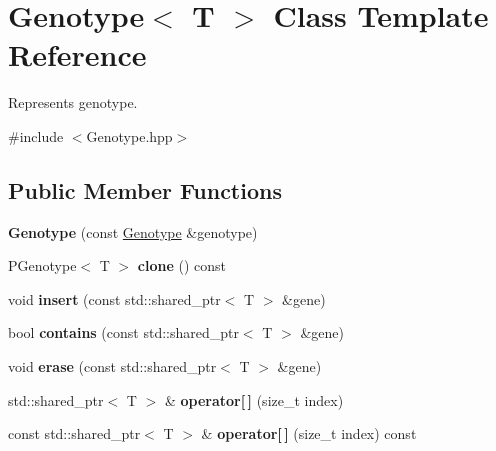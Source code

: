 \hypertarget{classGenotype}{}\section{Genotype$<$ T $>$ Class Template Reference}
\label{classGenotype}


Represents genotype.  




{\ttfamily \#include $<$Genotype.\+hpp$>$}

\subsection*{Public Member Functions}
\begin{DoxyCompactItemize}
\item 
{\bfseries Genotype} (const \hyperlink{classGenotype}{Genotype} \&genotype)\hypertarget{classGenotype_ae29841aca68c4e2f7ab34f5287aab699}{}\label{classGenotype_ae29841aca68c4e2f7ab34f5287aab699}

\item 
P\+Genotype$<$ T $>$ {\bfseries clone} () const \hypertarget{classGenotype_ae530c5a1420c152ea8c944aec6637ae0}{}\label{classGenotype_ae530c5a1420c152ea8c944aec6637ae0}

\item 
void {\bfseries insert} (const std\+::shared\+\_\+ptr$<$ T $>$ \&gene)\hypertarget{classGenotype_aa49caf873e5c01f7b0c36c0905f83902}{}\label{classGenotype_aa49caf873e5c01f7b0c36c0905f83902}

\item 
bool {\bfseries contains} (const std\+::shared\+\_\+ptr$<$ T $>$ \&gene)\hypertarget{classGenotype_aedc67c3bcfc023c2c3d39bfbe6ac4a97}{}\label{classGenotype_aedc67c3bcfc023c2c3d39bfbe6ac4a97}

\item 
void {\bfseries erase} (const std\+::shared\+\_\+ptr$<$ T $>$ \&gene)\hypertarget{classGenotype_a5970e8399e8d0d725517e23e309a32fb}{}\label{classGenotype_a5970e8399e8d0d725517e23e309a32fb}

\item 
std\+::shared\+\_\+ptr$<$ T $>$ \& {\bfseries operator\mbox{[}$\,$\mbox{]}} (size\+\_\+t index)\hypertarget{classGenotype_a79ab71079ff510e6cf879234d1173882}{}\label{classGenotype_a79ab71079ff510e6cf879234d1173882}

\item 
const std\+::shared\+\_\+ptr$<$ T $>$ \& {\bfseries operator\mbox{[}$\,$\mbox{]}} (size\+\_\+t index) const \hypertarget{classGenotype_aab215e1c057e93b3d986998bdae1f3d9}{}\label{classGenotype_aab215e1c057e93b3d986998bdae1f3d9}


\end{DoxyCompactItemize}
